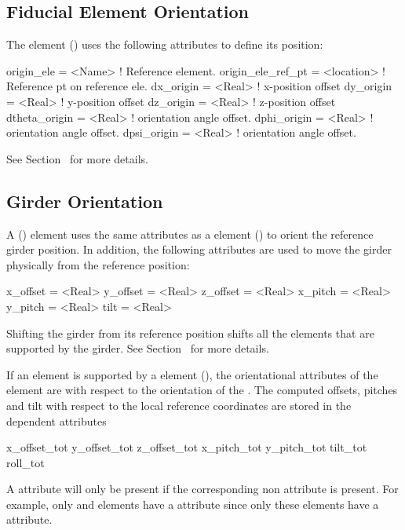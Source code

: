 \subsection{Fiducial Element Orientation}

The  element () uses the 
following attributes to define its position:
\begin{example}
  origin_ele        = <Name>     ! Reference element.
  origin_ele_ref_pt = <location> ! Reference pt on reference ele.
  dx_origin         = <Real>     ! x-position offset
  dy_origin         = <Real>     ! y-position offset
  dz_origin         = <Real>     ! z-position offset
  dtheta_origin     = <Real>     ! orientation angle offset.
  dphi_origin       = <Real>     ! orientation angle offset.
  dpsi_origin       = <Real>     ! orientation angle offset.
\end{example}
See Section~ for more details.



\subsection{Girder Orientation}

A  () element uses the same attributes as a 
element () to orient the reference girder position. In addition,
the following attributes are used to move the girder physically from the reference position: 
\begin{example}
  x_offset = <Real>
  y_offset = <Real>
  z_offset = <Real>
  x_pitch  = <Real>
  y_pitch  = <Real>
  tilt     = <Real>    
\end{example}
Shifting the girder from its reference position shifts all the elements that are
supported by the girder. See Section~ for more details.

If an element is supported by a  element (),
the orientational attributes of the element are with respect to the
orientation of the . The computed offsets, pitches and tilt with
respect to the local reference coordinates are stored in the dependent attributes
\begin{example}
  x_offset_tot
  y_offset_tot
  z_offset_tot
  x_pitch_tot
  y_pitch_tot
  tilt_tot
  roll_tot
\end{example}
A  attribute will only be present if the corresponding non
 attribute is present. For example, only  and
 elements have a  attribute since only these
elements have a  attribute.

